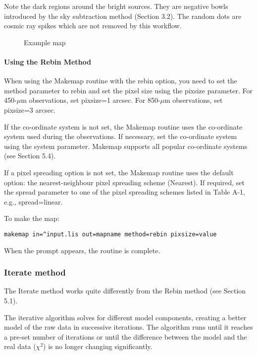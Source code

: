 \documentclass[twoside,11pt]{article}
\renewcommand{\_}{\texttt{\symbol{95}}}
\begin{document}
Note the dark regions around the bright sources. They are negative
bowls introduced by the sky subtraction method (Section 3.2). The
random dots are cosmic ray spikes which are not removed by this
workflow.

\begin{figure}
\caption{Example map}
\end{figure}

\paragraph{Using the Rebin Method}

When using the Makemap routine with the rebin option, you need to set
the method parameter to rebin and set the pixel size using the pixsize
parameter. For 450-$\mu$m observations, set pixsize=1 arcsec. For
850-$\mu$m observations, set pixsize=3 arcsec.

If the co-ordinate system is not set, the Makemap routine uses the
co-ordinate system used during the observations. If necessary, set the
co-ordinate system using the system parameter.  Makemap supports all
popular co-ordinate systems (see Section 5.4).

If a pixel spreading option is not set, the Makemap routine uses the
default option: the nearest-neighbour pixel spreading scheme
(Nearest). If required, set the spread parameter to one of the pixel
spreading schemes listed in Table A-1, e.g., spread=linear.

To make the map:
\begin{verbatim}
makemap in=^input.lis out=mapname method=rebin pixsize=value
\end{verbatim}
When the prompt appears, the routine is complete.

\subsubsection{Iterate method}

The Iterate method works quite differently from the Rebin method (see
Section 5.1).

The iterative algorithm solves for different model components,
creating a better model of the raw data in successive iterations. The
algorithm runs until it reaches a pre-set number of iterations or
until the difference between the model and the real data ($\chi^2$) is
no longer changing significantly.
\end{document}
